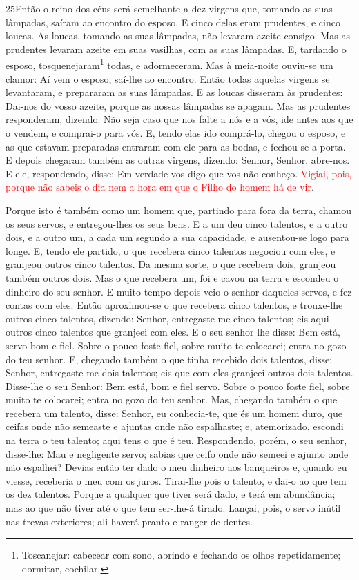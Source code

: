 \medskip

\lettrine{25} Então o reino dos céus será semelhante a dez
virgens que, tomando as suas lâmpadas, saíram ao encontro do esposo.
E cinco delas eram prudentes, e cinco loucas. As loucas,
tomando as suas lâmpadas, não levaram azeite consigo. Mas as
prudentes levaram azeite em suas vasilhas, com as suas lâmpadas.
E, tardando o esposo, tosquenejaram\footnote{Toscanejar:
cabecear com sono, abrindo e fechando os olhos repetidamente;
dormitar, cochilar.} todas, e adormeceram. Mas à meia-noite
ouviu-se um clamor: Aí vem o esposo, saí-lhe ao encontro. Então
todas aquelas virgens se levantaram, e prepararam as suas lâmpadas.
E as loucas disseram às prudentes: Dai-nos do vosso azeite,
porque as nossas lâmpadas se apagam. Mas as prudentes
responderam, dizendo: Não seja caso que nos falte a nós e a vós, ide
antes aos que o vendem, e comprai-o para vós. E, tendo elas
ido comprá-lo, chegou o esposo, e as que estavam preparadas entraram
com ele para as bodas, e fechou-se a porta. E depois chegaram
também as outras virgens, dizendo: Senhor, Senhor, abre-nos.
E ele, respondendo, disse: Em verdade vos digo que vos não
conheço. \textcolor{red}{Vigiai, pois, porque não sabeis o dia nem a
hora em que o Filho do homem há de vir}.

Porque isto é também como um homem que, partindo para fora da
terra, chamou os seus servos, e entregou-lhes os seus bens. E
a um deu cinco talentos, e a outro dois, e a outro um, a cada um
segundo a sua capacidade, e ausentou-se logo para longe. E,
tendo ele partido, o que recebera cinco talentos negociou com eles,
e granjeou outros cinco talentos. Da mesma sorte, o que
recebera dois, granjeou também outros dois. Mas o que
recebera um, foi e cavou na terra e escondeu o dinheiro do seu
senhor. E muito tempo depois veio o senhor daqueles servos, e
fez contas com eles. Então aproximou-se o que recebera cinco
talentos, e trouxe-lhe outros cinco talentos, dizendo: Senhor,
entregaste-me cinco talentos; eis aqui outros cinco talentos que
granjeei com eles. E o seu senhor lhe disse: Bem está, servo
bom e fiel. Sobre o pouco foste fiel, sobre muito te colocarei;
entra no gozo do teu senhor. E, chegando também o que tinha
recebido dois talentos, disse: Senhor, entregaste-me dois talentos;
eis que com eles granjeei outros dois talentos. Disse-lhe o
seu Senhor: Bem está, bom e fiel servo. Sobre o pouco foste fiel,
sobre muito te colocarei; entra no gozo do teu senhor. Mas,
chegando também o que recebera um talento, disse: Senhor, eu
conhecia-te, que és um homem duro, que ceifas onde não semeaste e
ajuntas onde não espalhaste; e, atemorizado, escondi na terra
o teu talento; aqui tens o que é teu. Respondendo, porém, o
seu senhor, disse-lhe: Mau e negligente servo; sabias que ceifo onde
não semeei e ajunto onde não espalhei? Devias então ter dado
o meu dinheiro aos banqueiros e, quando eu viesse, receberia o meu
com os juros. Tirai-lhe pois o talento, e dai-o ao que tem os
dez talentos. Porque a qualquer que tiver será dado, e terá
em abundância; mas ao que não tiver até o que tem ser-lhe-á tirado.
Lançai, pois, o servo inútil nas trevas exteriores; ali
haverá pranto e ranger de dentes.

